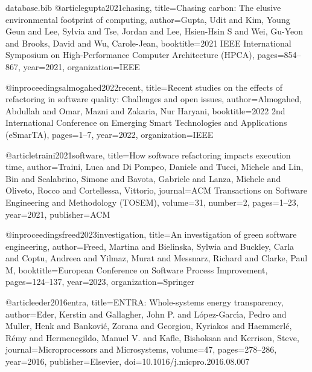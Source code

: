 \begin{filecontents*}{database.bib}
@article{gupta2021chasing,
  title={Chasing carbon: The elusive environmental footprint of computing},
  author={Gupta, Udit and Kim, Young Geun and Lee, Sylvia and Tse, Jordan and Lee, Hsien-Hsin S and Wei, Gu-Yeon and Brooks, David and Wu, Carole-Jean},
  booktitle={2021 IEEE International Symposium on High-Performance Computer Architecture (HPCA)},
  pages={854--867},
  year={2021},
  organization={IEEE}
}

@inproceedings{almogahed2022recent,
  title={Recent studies on the effects of refactoring in software quality: Challenges and open issues},
  author={Almogahed, Abdullah and Omar, Mazni and Zakaria, Nur Haryani},
  booktitle={2022 2nd International Conference on Emerging Smart Technologies and Applications (eSmarTA)},
  pages={1--7},
  year={2022},
  organization={IEEE}
}

@article{traini2021software,
  title={How software refactoring impacts execution time},
  author={Traini, Luca and Di Pompeo, Daniele and Tucci, Michele and Lin, Bin and Scalabrino, Simone and Bavota, Gabriele and Lanza, Michele and Oliveto, Rocco and Cortellessa, Vittorio},
  journal={ACM Transactions on Software Engineering and Methodology (TOSEM)},
  volume={31},
  number={2},
  pages={1--23},
  year={2021},
  publisher={ACM}
}

@inproceedings{freed2023investigation,
  title={An investigation of green software engineering},
  author={Freed, Martina and Bielinska, Sylwia and Buckley, Carla and Coptu, Andreea and Yilmaz, Murat and Messnarz, Richard and Clarke, Paul M},
  booktitle={European Conference on Software Process Improvement},
  pages={124--137},
  year={2023},
  organization={Springer}
}

@article{eder2016entra,
  title={ENTRA: Whole-systems energy transparency},
  author={Eder, Kerstin and Gallagher, John P. and L{\'o}pez-Garc{\'\i}a, Pedro and Muller, Henk and Bankovi{\'c}, Zorana and Georgiou, Kyriakos and Haemmerl{\'e}, R{\'e}my and Hermenegildo, Manuel V. and Kafle, Bishoksan and Kerrison, Steve},
  journal={Microprocessors and Microsystems},
  volume={47},
  pages={278--286},
  year={2016},
  publisher={Elsevier},
  doi={10.1016/j.micpro.2016.08.007}
}

\end{filecontents*}

